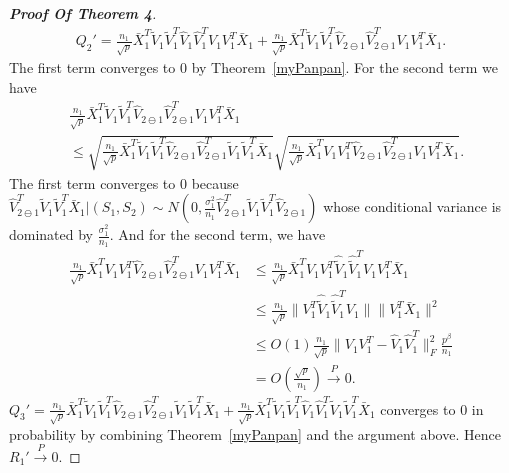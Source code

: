 \begin{proof}[\textbf{Proof Of Theorem 4}]
    \begin{equation*}
    \begin{aligned}
        Q_2'=\frac{n_1}{\sqrt{p}}\bar{X}_1^T \tilde{V}_1\tilde{V}_1^T\hat{V}_1\hat{V}_1^T V_1V_1^T \bar{X}_1
        +\frac{n_1}{\sqrt{p}}\bar{X}_1^T \tilde{V}_1\tilde{V}_1^T\hat{V}_{2\ominus 1}\hat{V}_{2\ominus 1}^T V_1V_1^T \bar{X}_1.
        \end{aligned}
    \end{equation*}
    The first term converges to $0$ by Theorem~\ref{myPanpan}.  For the second term we have
    \begin{equation*}
    \begin{aligned}
&\frac{n_1}{\sqrt{p}}\bar{X}_1^T \tilde{V}_1\tilde{V}_1^T\hat{V}_{2\ominus 1}\hat{V}_{2\ominus 1}^T V_1V_1^T \bar{X}_1\\
&\leq
\sqrt{\frac{n_1}{\sqrt{p}}\bar{X}_1^T \tilde{V}_1\tilde{V}_1^T\hat{V}_{2\ominus 1}\hat{V}_{2\ominus 1}^T \tilde{V}_1\tilde{V}_1^T \bar{X}_1}\sqrt{\frac{n_1}{\sqrt{p}}\bar{X}_1^T {V}_1{V}_1^T\hat{V}_{2\ominus 1}\hat{V}_{2\ominus 1}^T V_1V_1^T \bar{X}_1}.
    \end{aligned}
    \end{equation*}
The first term converges to $0$ because $\hat{V}_{2\ominus 1}^T \tilde{V}_1\tilde{V}_1^T \bar{X}_1|(S_1,S_2)\sim N(0,\frac{\sigma_1^2}{n_1}\hat{V}_{2\ominus 1}^T \tilde{V}_1\tilde{V}_1^T\hat{V}_{2\ominus 1})$ whose conditional variance is dominated by $\frac{\sigma^2_1}{n_1}$. And for the second term, we have
\begin{equation*}
\begin{aligned}
\frac{n_1}{\sqrt{p}}\bar{X}_1^T {V}_1{V}_1^T\hat{V}_{2\ominus 1}\hat{V}_{2\ominus 1}^T V_1V_1^T \bar{X}_1
&\leq
\frac{n_1}{\sqrt{p}}\bar{X}_1^T {V}_1{V}_1^T\hat{\tilde{V}}_{1}\hat{\tilde{V}}_{1}^T V_1V_1^T \bar{X}_1\\
&\leq
\frac{n_1}{\sqrt{p}}\|{V}_1^T\hat{\tilde{V}}_{1}\hat{\tilde{V}}_{1}^T V_1\|\|V_1^T \bar{X}_1\|^2\\
&\leq O(1)\frac{n_1}{\sqrt{p}}\|V_1 V_1^T -\hat{V}_1\hat{V}_1^T\|^2_F \frac{p^{\beta}}{n_1}\\
&=O(\frac{\sqrt{p}}{n_1})\xrightarrow{P}0.
\end{aligned}
\end{equation*}
$Q_3'=
\frac{n_1}{\sqrt{p}}\bar{X}_1^T \tilde{V}_1\tilde{V}_1^T\hat{V}_{2\ominus 1}\hat{V}_{2\ominus 1}^T \tilde{V}_1\tilde{V}_1^T \bar{X}_1+
\frac{n_1}{\sqrt{p}}\bar{X}_1^T \tilde{V}_1\tilde{V}_1^T\hat{V}_{1}\hat{V}_{1}^T \tilde{V}_1\tilde{V}_1^T \bar{X}_1$
    converges to $0$ in probability by combining Theorem~\ref{myPanpan} and the argument above. Hence $R_1'\xrightarrow{P}0$.


\end{proof}

